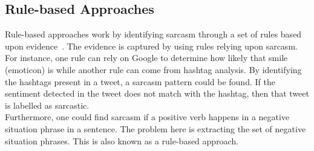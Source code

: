 \subsection{Rule-based Approaches}
Rule-based approaches work by identifying sarcasm through a set of rules based upon evidence~\cite{joshi2017automatic}. The evidence is captured by using rules relying upon sarcasm. For instance, one rule can rely on Google to determine how likely that smile (emoticon) is while another rule can come from hashtag analysis. By identifying the hashtags present in a tweet, a sarcasm pattern could be found. If the sentiment detected in the tweet does not match with the hashtag, then that tweet is labelled as sarcastic.\\ Furthermore, one could find sarcasm if a positive verb happens in a negative situation phrase in a sentence. The problem here is extracting the set of negative situation phrases. This is also known as a rule-based approach.
